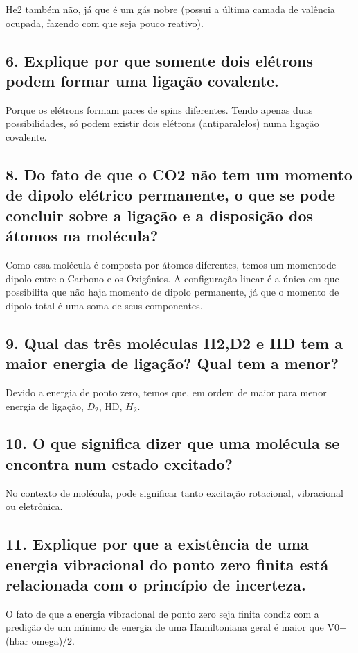 \documentclass{article}
\begin{document}
He2 também não, já que é um gás nobre (possui a última camada de valência ocupada, fazendo com que seja pouco reativo).

\subsection{6. Explique por que somente dois elétrons podem formar uma ligação covalente.}
Porque os elétrons formam pares de spins diferentes. Tendo apenas duas possibilidades, só podem existir dois elétrons (antiparalelos) numa ligação covalente.

\subsection{8. Do fato de que o CO2 não tem um momento de dipolo elétrico permanente, o que se pode concluir sobre a ligação e a disposição dos átomos na molécula?}

Como essa molécula é composta por átomos diferentes, temos um momentode dipolo entre o Carbono e os Oxigênios. A configuração linear é a única em que possibilita que não haja momento de dipolo permanente, já que o momento de dipolo total é uma soma de seus componentes.

\subsection{9. Qual das três moléculas H2,D2 e HD tem a maior energia de ligação? Qual tem a menor?}
Devido a energia de ponto zero, temos que, em ordem de maior para menor energia de ligação, $D_2$, HD, $H_2$.

\subsection{10. O que significa dizer que uma molécula se encontra num estado excitado?}
No contexto de molécula, pode significar tanto excitação rotacional, vibracional ou eletrônica.

\subsection{11. Explique por que a existência de uma energia vibracional do ponto zero finita está relacionada com o princípio de incerteza.}

O fato de que a energia vibracional de ponto zero seja finita condiz com a predição de um mínimo de energia de uma Hamiltoniana geral é maior que V0+(hbar omega)/2.
\end{document}
